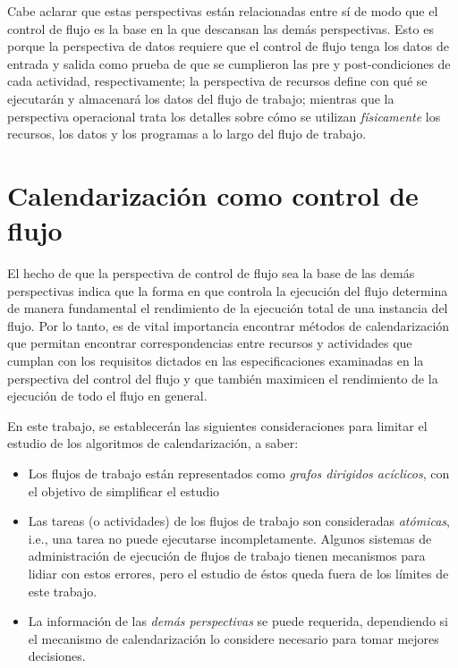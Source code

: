 \documentclass[letterpaper, 12pt]{report}
\begin{document}
Cabe aclarar que estas perspectivas están relacionadas entre sí de modo que el control de flujo es la base en la que descansan las demás perspectivas. Esto es porque la perspectiva de datos requiere que el control de flujo tenga los datos de entrada y salida como prueba de que se cumplieron las pre y post-condiciones de cada actividad, respectivamente; la perspectiva de recursos define con qué se ejecutarán y almacenará los datos del flujo de trabajo; mientras que la perspectiva operacional trata los detalles sobre cómo se utilizan \emph{físicamente} los recursos, los datos y los programas a lo largo del flujo de trabajo.

\section{Calendarización como control de flujo}

El hecho de que la perspectiva de control de flujo sea la base de las demás perspectivas indica que la forma en que controla la ejecución del flujo determina de manera fundamental el rendimiento de la ejecución total de una instancia del flujo. Por lo tanto, es de vital importancia encontrar métodos de calendarización que permitan encontrar correspondencias entre recursos y actividades que cumplan con los requisitos dictados en las especificaciones examinadas en la perspectiva del control del flujo y que también maximicen el rendimiento de la ejecución de todo el flujo en general.

En este trabajo, se establecerán las siguientes consideraciones para limitar el estudio de los algoritmos de calendarización, a saber:

\begin{itemize}
\item{Los flujos de trabajo están representados como \emph{grafos dirigidos acíclicos}, con el objetivo de simplificar el estudio}

\item{Las tareas (o actividades) de los flujos de trabajo son consideradas \emph{atómicas}, i.e., una tarea no puede ejecutarse incompletamente. Algunos sistemas de administración de ejecución de flujos de trabajo tienen mecanismos para lidiar con estos errores, pero el estudio de éstos queda fuera de los límites de este trabajo.}

\item{La información de las \emph{demás perspectivas} se puede requerida, dependiendo si el mecanismo de calendarización lo considere necesario para tomar mejores decisiones.}
\end{itemize}
\end{document}
